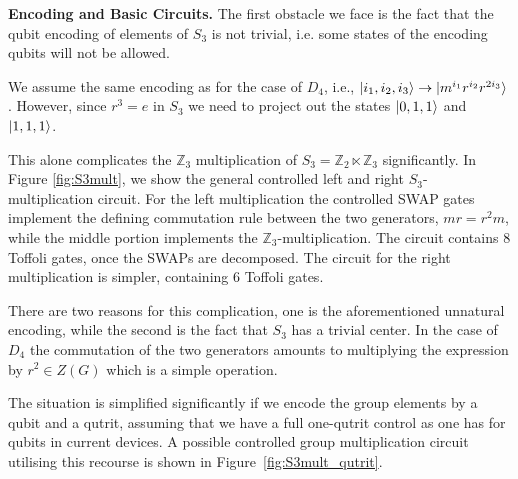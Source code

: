 \documentclass[two column]{article}
\newcommand{\caro}[1]{\textcolor{red}{[#1]}}
\begin{document}
\textbf{Encoding and Basic Circuits.} The first obstacle we face is the fact that the qubit encoding of elements of $S_3$ is not trivial, i.e. some states of the encoding qubits will not be allowed.

We assume the same encoding as for the case of $D_4$, i.e., $\ket{i_1,i_2,i_3} \to \ket{m^{i_1}r^{i_2}r^{2 i_3}}$. However, since $r^3 = e$ in $S_3$ we need to project out the states $\ket{0,1,1}$ and $\ket{1,1,1}$.

This alone complicates the $\mathbb{Z}_3$ multiplication of $S_3 = \mathbb{Z}_2 \ltimes \mathbb{Z}_3$ significantly. In Figure \ref{fig:S3mult}, we show the general controlled left and right $S_3$-multiplication circuit. For the left multiplication the controlled SWAP gates implement the defining commutation rule between the two generators, $mr = r^2m$, while the middle portion implements the $\mathbb{Z}_3$-multiplication. The circuit contains 8 Toffoli gates, once the SWAPs are decomposed. The circuit for the right multiplication is simpler, containing 6 Toffoli gates.

There are two reasons for this complication, one is the aforementioned unnatural encoding, while the second is the fact that $S_3$ has a trivial center. In the case of $D_4$ the commutation of the two generators amounts to multiplying the expression by $r^2 \in Z(G)$ which is a simple operation.

The situation is simplified significantly if we encode the group elements by a qubit and a qutrit, assuming that we have a full one-qutrit control as one has for qubits in current devices. A possible controlled group multiplication circuit utilising this recourse is shown in Figure~\ref{fig:S3mult_qutrit}.%
\end{document}
